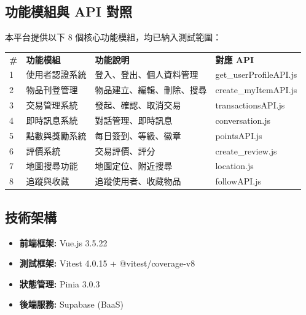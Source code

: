 \documentclass[11pt, a4paper]{article}
\begin{document}
\subsection{功能模組與 API 對照}
本平台提供以下 8 個核心功能模組，均已納入測試範圍：

\begin{center}
  \renewcommand{\arraystretch}{1.5}
  \begin{longtable}{p{} p{} p{} p{}}
    \rowcolor{NavyBlue} \color{white}\textbf{\#} & \color{white}\textbf{功能模組} & \color{white}\textbf{功能說明} & \color{white}\textbf{對應 API} \\
    1                                            & 使用者認證系統                    & 登入、登出、個人資料管理               & get\_userProfileAPI.js       \\
    \rowcolor{LightGray} 2                       & 物品刊登管理                     & 物品建立、編輯、刪除、搜尋              & create\_myItemAPI.js         \\
    3                                            & 交易管理系統                     & 發起、確認、取消交易                 & transactionsAPI.js           \\
    \rowcolor{LightGray} 4                       & 即時訊息系統                     & 對話管理、即時訊息                  & conversation.js              \\
    5                                            & 點數與獎勵系統                    & 每日簽到、等級、徽章                 & pointsAPI.js                 \\
    \rowcolor{LightGray} 6                       & 評價系統                       & 交易評價、評分                    & create\_review.js            \\
    7                                            & 地圖搜尋功能                     & 地圖定位、附近搜尋                  & location.js                  \\
    \rowcolor{LightGray} 8                       & 追蹤與收藏                      & 追蹤使用者、收藏物品                 & followAPI.js                 \\
  \end{longtable}
\end{center}

\subsection{技術架構}
\begin{itemize}[label=\textcolor{ElectricCyan}{$\blacksquare$}]
  \item \textbf{前端框架:} Vue.js 3.5.22
  \item \textbf{測試框架:} Vitest 4.0.15 + @vitest/coverage-v8
  \item \textbf{狀態管理:} Pinia 3.0.3
  \item \textbf{後端服務:} Supabase (BaaS)
\end{itemize}
\end{document}
